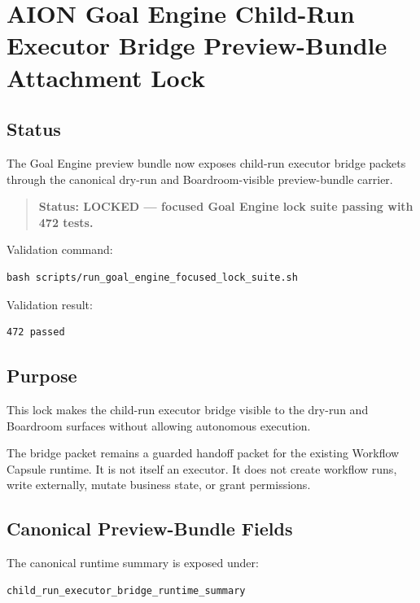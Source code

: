 \section{AION Goal Engine Child-Run Executor Bridge Preview-Bundle Attachment Lock}
\label{sec:aion-goal-engine-child-run-executor-bridge-preview-bundle-attachment-lock}

\subsection{Status}

The Goal Engine preview bundle now exposes child-run executor bridge packets through the canonical dry-run and Boardroom-visible preview-bundle carrier.

\begin{quote}
\textbf{Status: LOCKED --- focused Goal Engine lock suite passing with 472 tests.}
\end{quote}

Validation command:

\begin{verbatim}
bash scripts/run_goal_engine_focused_lock_suite.sh
\end{verbatim}

Validation result:

\begin{verbatim}
472 passed
\end{verbatim}

\subsection{Purpose}

This lock makes the child-run executor bridge visible to the dry-run and Boardroom surfaces without allowing autonomous execution.

The bridge packet remains a guarded handoff packet for the existing Workflow Capsule runtime. It is not itself an executor. It does not create workflow runs, write externally, mutate business state, or grant permissions.

\subsection{Canonical Preview-Bundle Fields}

The canonical runtime summary is exposed under:

\begin{verbatim}
child_run_executor_bridge_runtime_summary
\end{verbatim}


